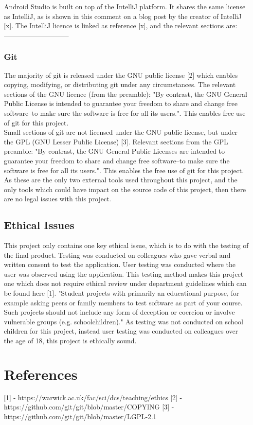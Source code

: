 \documentclass{article}
\begin{document}
Android Studio is built on top of the IntelliJ platform. It shares the same license as IntelliJ, as is shown in this comment on a blog post by the creator of IntelliJ [x]. The IntelliJ licence is linked as reference [x], and the relevant sections are: -----------------------------\\


\subsubsection{Git}

The majority of git is released under the GNU public license [2] which enables copying, modifying, or distributing git under any circumstances. The relevant sections of the GNU licence (from the preamble): "By contrast, the GNU General Public License is intended to guarantee your freedom to share and change free software--to make sure the software is free for all its users.". This enables free use of git for this project. \\

Small sections of git are not licensed under the GNU public license, but under the GPL (GNU Lesser Public License) [3]. Relevant sections from the GPL preamble: "By contrast, the GNU General Public Licenses are intended to guarantee your freedom to share and change free software--to make sure the software is free for all its users.". This enables the free use of git for this project. \\

As these are the only two external tools used throughout this project, and the only tools which could have impact on the source code of this project, then there are no legal issues with this project.

\subsection{Ethical Issues}

This project only contains one key ethical issue, which is to do with the testing of the final product. Testing was conducted on colleagues who gave verbal and written consent to test the application. User testing was conducted where the user was observed using the application. This testing method makes this project one which does not require ethical review under department guidelines which can be found here [1]. "Student projects with primarily an educational purpose, for example asking peers or family members to test software as part of your course. Such projects should not include any form of deception or coercion or involve vulnerable groups (e.g. schoolchildren)." As testing was not conducted on school children for this project, instead user testing was conducted on colleagues over the age of 18, this project is ethically sound. 

\section{References}

[1] - https://warwick.ac.uk/fac/sci/dcs/teaching/ethics
[2] - https://github.com/git/git/blob/master/COPYING
[3] - https://github.com/git/git/blob/master/LGPL-2.1
\end{document}
